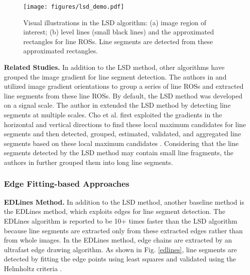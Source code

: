 \documentclass[journal,compsoc]{IEEEtran}
\begin{document}
\begin{figure}[tbp]
	\centering
	\texttt{[image: figures/lsd\_demo.pdf]}
	\caption{Visual illustrations in the LSD \cite{LSD,LSDaLineSegmentDetector} algorithm: (a) image region of interest; (b) level lines (small black lines) and the approximated rectangles for line ROSs. Line segments are detected from these approximated rectangles.}
	\label{lsd_level_line}
\end{figure}

\textbf{Related Studies.} In addition to the LSD method, other algorithms have grouped the image gradient for line segment detection. The authors in \cite{AParameterlessLineSegmentandEllipticalArcDetectorwithEnhancedEllipseFitting} and \cite{JointAContrarioEllipseandLineDetection} utilized image gradient orientations to group a series of line ROSs and extracted line segments from these line ROSs. By default, the LSD method was developed on a signal scale. The author in \cite{MultiscalelinesegmentdetectorforrobustandaccurateSfM} extended the LSD method by detecting line segments at multiple scales. Cho et al. first exploited the gradients in the horizontal and vertical directions to find these local maximum candidates for line segments and then detected, grouped, estimated, validated, and aggregated line segments based on these local maximum candidates \cite{ANovelLineletBasedRepresentationforLineSegmentDetection}. Considering that the line segments detected by the LSD method may contain small line fragments, the authors in \cite{FSG, PLSD} further grouped them into long line segments.


\subsubsection{Edge Fitting-based Approaches}
\label{subsubsec_detection_edge}
\textbf{EDLines Method.} In addition to the LSD method, another baseline method is the EDLines \cite{EDLines} method, which exploits edges for line segment detection. The EDLines algorithm is reported to be 10+ times faster than the LSD algorithm because line segments are extracted only from these extracted edges rather than from whole images. In the EDLines method, edge chains are extracted by an ultrafast edge drawing \cite{EdgeDrawing} algorithm. As shown in Fig. \ref{edlines}, line segments are detected by fitting the edge points using least squares and validated using the Helmholtz criteria \cite{desolneux2007gestalt}.
\end{document}

